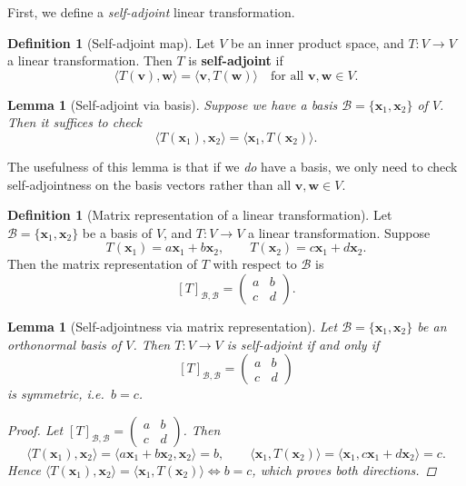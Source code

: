 \documentclass[10pt, a4paper]{article}
\theoremstyle{plain}
\newtheorem{lemma}[theorem]{Lemma}
\theoremstyle{definition}
\newtheorem{definition}[theorem]{Definition}
\theoremstyle{remark}
\begin{document}
First, we define a \emph{self-adjoint} linear transformation.

\begin{definition}[Self-adjoint map]
  Let $V$ be an inner product space, and $T: V \to V$ a linear transformation. Then $T$ is
  \textbf{self-adjoint} if
  \[
    \langle T(\mathbf{v}), \mathbf{w} \rangle = \langle \mathbf{v}, T(\mathbf{w}) \rangle
    \quad \text{for all } \mathbf{v}, \mathbf{w} \in V.
  \]
\end{definition}

\begin{lemma}[Self-adjoint via basis]
  Suppose we have a basis $\mathcal{B} = \{\mathbf{x}_1, \mathbf{x}_2\}$ of $V$. Then it
  suffices to check
  \[
    \langle T(\mathbf{x}_1), \mathbf{x}_2 \rangle = \langle \mathbf{x}_1, T(\mathbf{x}_2) \rangle.
  \]
\end{lemma}

The usefulness of this lemma is that if we \emph{do} have a basis, we only need to check
self-adjointness on the basis vectors rather than all $\mathbf{v}, \mathbf{w} \in V$.

\begin{definition}[Matrix representation of a linear transformation]
  Let $\mathcal{B} = \{\mathbf{x}_1, \mathbf{x}_2\}$ be a basis of $V$, and $T: V \to V$ a
  linear transformation. Suppose
  \[
    T(\mathbf{x}_1) = a\mathbf{x}_1 + b\mathbf{x}_2, \qquad
    T(\mathbf{x}_2) = c\mathbf{x}_1 + d\mathbf{x}_2.
  \]
  Then the matrix representation of $T$ with respect to $\mathcal{B}$ is
  \[
    [T]_{\mathcal{B},\mathcal{B}} = \begin{pmatrix} a & b \\ c & d \end{pmatrix}.
  \]
\end{definition}

\begin{lemma}[Self-adjointness via matrix representation]
  Let $\mathcal{B} = \{\mathbf{x}_1, \mathbf{x}_2\}$ be an \emph{orthonormal} basis of $V$.
  Then $T: V \to V$ is self-adjoint if and only if
  \[
    [T]_{\mathcal{B},\mathcal{B}} = \begin{pmatrix} a & b \\ c & d \end{pmatrix}
  \]
  is symmetric, i.e.\ $b = c$.

\begin{proof}
  Let $[T]_{\mathcal{B},\mathcal{B}} = \begin{pmatrix} a & b \\ c & d \end{pmatrix}$. Then
  \[
    \langle T(\mathbf{x}_1), \mathbf{x}_2 \rangle
    = \langle a\mathbf{x}_1 + b\mathbf{x}_2, \mathbf{x}_2 \rangle = b,
    \qquad
    \langle \mathbf{x}_1, T(\mathbf{x}_2) \rangle
    = \langle \mathbf{x}_1, c\mathbf{x}_1 + d\mathbf{x}_2 \rangle = c.
  \]
  Hence $\langle T(\mathbf{x}_1), \mathbf{x}_2 \rangle = \langle \mathbf{x}_1, T(\mathbf{x}_2) \rangle
  \iff b = c$, which proves both directions.
\end{proof}
\end{lemma}
\end{document}
